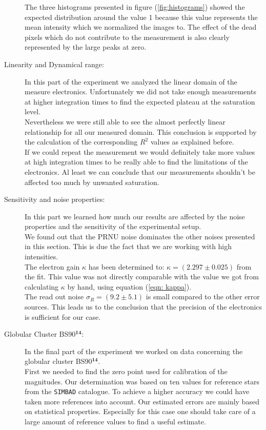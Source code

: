 \begin{description}
	The three histograms presented in figure (\ref{fig:histograms}) showed the expected distribution around the value 1 because this value represents the mean intensity which we normalized the images to. The effect of the dead pixels which do not contribute to the measurement is also clearly represented by the large peaks at zero. 
	\item[Linearity and Dynamical range:] In this part of the experiment we analyzed the linear domain of the measure electronics. Unfortunately we did not take enough measurements at higher integration times to find the expected plateau at the saturation level. \\
	Nevertheless we were still able to see the almost perfectly linear relationship for all our measured domain. This conclusion is supported by the calculation of the corresponding $R^2$ values as explained before. \\
	If we could repeat the measurement we would definitely take more values at high integration times to be really able to find the limitations of the electronics. Al least we can conclude that our measurements shouldn't be affected too much by unwanted saturation. 
	\item[Sensitivity and noise properties:] In this part we learned how much our results are affected by the noise properties and the sensitivity of the experimental setup. \\
	We found out that the PRNU noise dominates the other noises presented in this section. This is due the fact that we are working with high intensities.\\
	The electron gain $\kappa$ has been determined to: $\kappa = (2.297 \pm 0.025)$ from the fit. This value was not directly comparable with the value we got from calculating $\kappa$ by hand, using equation (\ref{eqn: kappa}). \\
	The read out noise $\sigma_R = (9.2 \pm 5.1)$ is small compared to the other error sources. This leads us to the conclusion that the precision of the electronics is sufficient for our case.
	\item[Globular Cluster BS90$^{\mathbf{14}}$:] In the final part of the experiment we worked on data concerning the globular cluster BS90$^{\mathbf{14}}$. \\
	First we needed to find the zero point used for calibration of the magnitudes. Our determination was based on ten values for reference stars from the \texttt{SIMBAD} catalogue. To achieve a higher accuracy we could have taken more references into account. Our estimated errors are mainly based on statistical properties. Especially for this case one should take care of a large amount of reference values to find a useful estimate. \\

\end{description}
